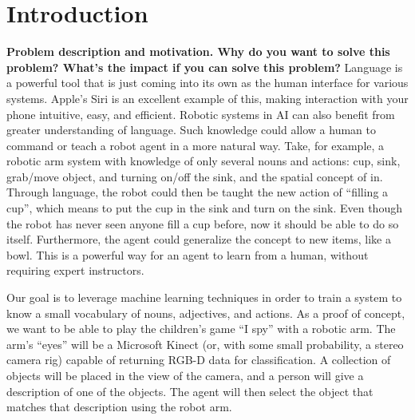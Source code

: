 \documentclass[11pt]{article}
\title{\xxx{Linguistic Classification of Objects}}
\author{Rob Goeddel \and Lauren Hinkle \and James Kirk \and Aaron Mininger}
\date{}
\newcommand{\xxx}[1]{{\bf \color{red} #1}}
\begin{document}
\maketitle

\begin{abstract}
Interaction between robots and humans is a rapidly growing area of reasearch. Of particular interest is the desire to interact with robots or agents using natural language. This gives humans a more natural and effective way of teaching, commanding, and interacting with robotic agents or computers. Our work is designed to process images and provide descriptions of objects that can then be used in interactions with humans. We use images from a RGB-D camera in order to classify properties of objects including size, shape, and color. Those descriptions are then fed into a higher-level agent which handles the human interaction. We specifically use a simple I-Spy game to allow users to refer to objects using descriptions in natural language.
\end{abstract}

\section{Introduction}
\xxx{Problem description and motivation. Why do you want to solve this
    problem? What's the impact if you can solve this problem?}
Language is a powerful tool that is just coming into its own as the human
interface for various systems. Apple's Siri is an excellent example of this, making interaction with your phone intuitive, easy, and efficient. Robotic systems in AI can also benefit from greater understanding of
language. Such knowledge could allow a human to command or teach a robot agent in a more natural way. Take, for example, a robotic arm system with knowledge of only
several nouns and actions: cup, sink, grab/move object, and turning on/off
the sink, and the spatial concept of in. Through language, the robot could then be taught the new action of ``filling a cup'', which means to put the cup in the sink and turn on the
sink. Even though the robot has never seen anyone fill a cup before, now
it should be able to do so itself. Furthermore, the agent could generalize the concept to new items, like a bowl. This is a powerful
way for an agent to learn from a human, without requiring expert instructors.

Our goal is to leverage machine learning techniques in order to train a system to know a small vocabulary of nouns, adjectives,
and actions. As a proof of concept, we want to be able to play the children's
game ``I spy'' with a robotic arm. The arm's ``eyes'' will be a Microsoft
Kinect (or, with some small probability, a stereo camera rig) capable of
returning RGB-D data for classification. A collection of objects will be placed in the view of the camera, and a person will give a description of one of the objects. The agent will then select the object that matches that description using the robot arm.
\end{document}
